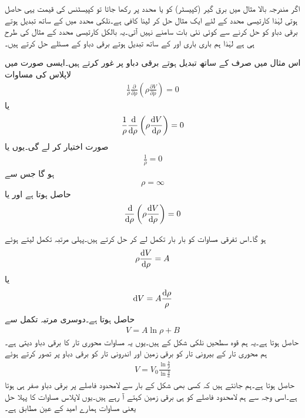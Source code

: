 اگر مندرجہ بالا مثال میں برق گیر (کپیسٹر)  کو  یا  محدد پر رکھا جاتا تو کپیسٹنس کی قیمت یہی حاصل ہوتی لہٰذا کارتیسی محدد کے لئے ایک مثال حل کر لینا کافی ہے۔نلکی محدد میں  کے ساتھ تبدیل ہوتے برقی دباو کو حل کرنے سے کوئی نئی بات سامنے نہیں آتی۔یہ بالکل کارتیسی محدد کے مثال کی طرح ہی ہے لہٰذا ہم باری باری  اور  کے ساتھ تبدیل ہوتے برقی دباو کے مسئلے حل کرتے ہیں۔


اس مثال میں صرف  کے ساتھ تبدیل ہوتے برقی دباو پر غور کرتے ہیں۔ایسی صورت میں لاپلاس کی مساوات
\begin{align*}
\frac{1}{\rho} \frac{\partial}{\partial \rho} \left(\rho \frac{\partial V}{\partial \rho} \right)=0
\end{align*}
یا
\begin{align}\label{مساوات_لاپلاس_ہم_محوری_لاپلاسی}
\frac{1}{\rho}\frac{\dif}{\dif \rho} \left(\rho \frac{\dif V}{\dif \rho} \right)=0
\end{align}
صورت اختیار کر لے گی۔یوں یا
\begin{align*}
\frac{1}{\rho}=0
\end{align*}
ہو گا جس سے
\begin{align}\label{مساوات_لاپلاس_ہم_محوری_لاپلاسی_پہلا-حل}
\rho=\infty
\end{align}
حاصل ہوتا ہے اور یا
\begin{align}\label{مساوات_لاپلاس_ہم_محوری_لاپلاسی_ب}
\frac{\dif}{\dif \rho} \left(\rho \frac{\dif V}{\dif \rho} \right)=0
\end{align}

ہو گا۔اس تفرقی مساوات کو بار بار تکمل لے کر حل کرتے ہیں۔پہلی مرتبہ تکمل لیتے ہوئے
\begin{align*}
\rho \frac{\dif V}{\dif \rho}=A
\end{align*}
یا
\begin{align*}
\dif V=A \frac{\dif \rho}{\rho}
\end{align*}
حاصل ہوتا ہے۔دوسری مرتبہ تکمل سے
\begin{align*}
V=A \ln \rho+B
\end{align*}
حاصل ہوتا ہے۔یہ ہم قوہ سطحیں نلکی شکل کے ہیں۔یوں یہ مساوات محوری تار کا برقی دباو دیتی ہے۔ہم محوری تار کے بیرونی تار  کو برقی زمین اور اندرونی تار  کو  برقی دباو پر تصور کرتے ہوئے
\begin{align}\label{مساوات_لاپلاس_ہم_محوری_لاپلاسی_ب_حل}
V=V_0 \frac{\ln \frac{b}{\rho} }{\ln \frac{b}{a} }
\end{align}
حاصل ہوتا ہے۔ہم جانتے ہیں کہ کسی بھی شکل کے بار سے لامحدود فاصلے پر برقی دباو صفر ہی ہوتا ہے۔اسی وجہ سے ہم لامحدود فاصلے کو ہی برقی زمین کہتے آ رہے ہیں۔یوں لاپلاس مساوات کا پہلا حل یعنی مساوات  ہمارے امید کے عین مطابق ہے۔

